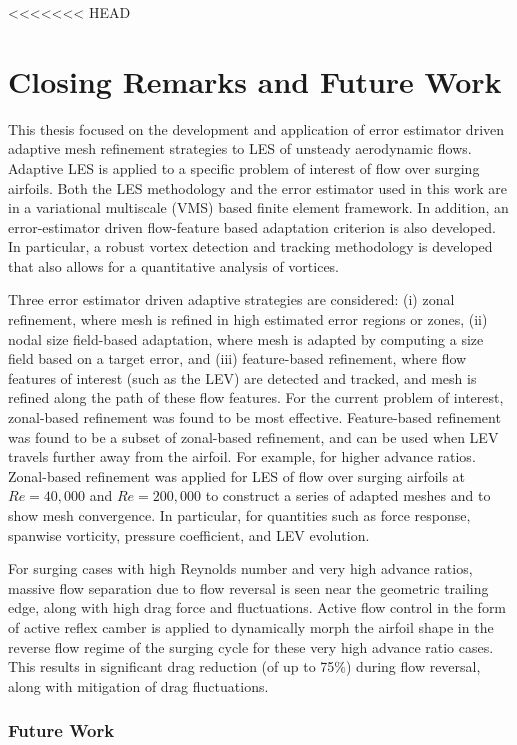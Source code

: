 <<<<<<< HEAD
\chapter{Closing Remarks and Future Work}

This thesis focused on the development and application of error estimator driven adaptive mesh refinement strategies to LES of unsteady aerodynamic flows.
Adaptive LES is applied to a specific problem of interest of flow over surging airfoils.
Both the LES methodology and the error estimator used in this work are in a variational multiscale (VMS) based finite element framework.
In addition, an error-estimator driven flow-feature based adaptation criterion is also developed. In particular, a robust vortex detection and tracking methodology is developed that also allows for a quantitative analysis of vortices.

Three error estimator driven adaptive strategies are considered: (i) zonal refinement, where mesh is refined in high estimated error regions or zones, (ii) nodal size field-based adaptation, where mesh is adapted by computing a size field based on a target error, and (iii) feature-based refinement, where flow features of interest (such as the LEV) are detected and tracked, and mesh is refined along the path of these flow features.
For the current problem of interest, zonal-based refinement was found to be most effective.
Feature-based refinement was found to be a subset of zonal-based refinement, and can be used when LEV travels further away from the airfoil. 
For example, for higher advance ratios.
Zonal-based refinement was applied for LES of flow over surging airfoils at $Re=40,000$ and $Re=200,000$ to construct a series of adapted meshes and to show mesh convergence. In particular, for quantities such as force response, spanwise vorticity, pressure coefficient, and LEV evolution.

For surging cases with high Reynolds number and very high advance ratios, massive flow separation due to flow reversal is seen near the geometric trailing edge, along with high drag force and fluctuations. 
Active flow control in the form of active reflex camber is applied to dynamically morph the airfoil shape in the reverse flow regime of the surging cycle for these very high advance ratio cases.
This results in significant drag reduction (of up to 75\%) during flow reversal, along with mitigation of drag fluctuations.

\subsection{Future Work}


